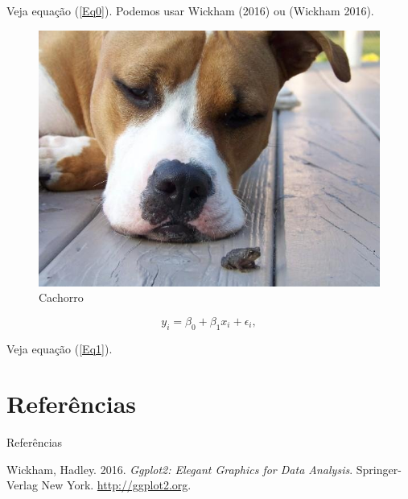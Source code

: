 \documentclass[10pt,ignorenonframetext,]{beamer}
\begin{document}
\begin{frame}{Veja equação (\ref{Eq0}). Podemos usar Wickham (2016) ou
(Wickham 2016).}
\protect\hypertarget{veja-equauxe7uxe3o-.-podemos-usar-ggplot2-ou-ggplot2.}{}

\begin{figure}

{\centering \includegraphics[width=0.5\linewidth]{cachorro} 

}

\caption{Cachorro}\label{fig:unnamed-chunk-11}
\end{figure}

\begin{equation}
y_i=\beta_0 + \beta_1 x_i + \epsilon_i,\label{Eq1}
\end{equation}

Veja equação (\ref{Eq1}).

\end{frame}

\hypertarget{referuxeancias}{%
\section{Referências}\label{referuxeancias}}

\begin{frame}{Referências}
\protect\hypertarget{referuxeancias-1}{}

\hypertarget{refs}{}
\leavevmode\hypertarget{ref-ggplot2}{}%
Wickham, Hadley. 2016. \emph{Ggplot2: Elegant Graphics for Data
Analysis}. Springer-Verlag New York. \url{http://ggplot2.org}.

\end{frame}
\end{document}
